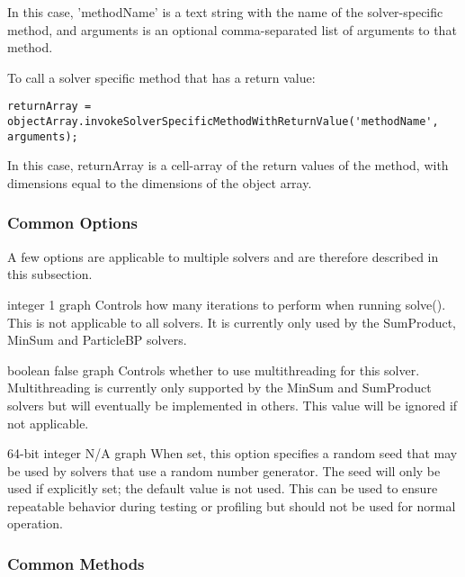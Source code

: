 In this case, 'methodName' is a text string with the name of the solver-specific method, and arguments is an optional comma-separated list of arguments to that method.

To call a solver specific method that has a return value:
\begin{lstlisting}
returnArray = objectArray.invokeSolverSpecificMethodWithReturnValue('methodName', arguments);
\end{lstlisting}

In this case, returnArray is a cell-array of the return values of the method, with dimensions equal to the dimensions of the object array.

\fi

\subsubsection{Common Options}

A few options are applicable to multiple solvers and are therefore described in this subsection.


{integer}
{1}
{graph}
{Controls how many iterations to perform when running solve(). This is not applicable to all solvers. It is currently only used by the SumProduct, MinSum and ParticleBP solvers.}


{boolean}
{false}
{graph}
{Controls whether to use multithreading for this solver. Multithreading is currently only supported by the MinSum and SumProduct solvers but will eventually be implemented in others. This value will be ignored if not applicable.}


{64-bit integer}
{N/A}
{graph}
{When set, this option specifies a random seed that may be used by solvers that use a random number generator. The seed will only be used if explicitly set; the default value is not used. This can be used to ensure repeatable behavior during testing or profiling but should not be used for normal operation.}

\subsubsection{Common Methods}

